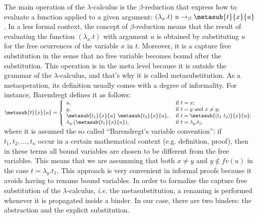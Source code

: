  The main operation of the $\lambda$-calculus is the $\beta$-reduction that express how to evaluate a function applied to a given argument: $(\lambda_x.t)\ u \to_{\beta} \metasub{t}{x}{u}$. In a less formal context, the concept of $\beta$-reduction means that the result of evaluating the function $(\lambda_x.t)$ with argument $u$ is obtained by substituting $u$ for the free ocurrences of the variable $x$ in $t$. Moreover, it is a capture free substitution in the sense that no free variable becomes bound after the substitution. This operation is in the meta level because it is outside the grammar of the $\lambda$-calculus, and that's why it is called metasubstitution. As a metaoperation, its definition usually comes with a degree of informality. For instance, Barendregt\cite{barendregtLambdaCalculusIts1984} defines it as follows: \vspace{.5cm}
$\metasub{t}{x}{u} = \left\{
 \begin{array}{ll}
  u, & \mbox{ if } t = x; \\
  y, & \mbox{ if } t = y \mbox{ and } x \neq y; \\
  \metasub{t_1}{x}{u}\ \metasub{t_2}{x}{u}, & \mbox{ if } t = \metasub{(t_1\ t_2)}{x}{u}; \\
  \lambda_y.(\metasub{t_1}{x}{u}), & \mbox{ if } t = \lambda_y.t_1.
 \end{array}\right.$ \vspace{.5cm}
\noindent where it is assumed the so called ``Barendregt's variable convention'': if $t_1, t_2, \ldots, t_n$ occur in a certain mathematical context (e.g. definition, proof), then in these terms all bound variables are chosen to be different from the free variables. This means that we are assumming that both $x \neq y$ and $y\notin fv(u)$ in the case $t = \lambda_y.t_1$. This approach is very convenient in informal proofs because it avoids having to rename bound variables. In order to formalize the capture free substitution of the $\lambda$-calculus, {\it i.e.} the metasubstitution, a renaming is performed whenever it is propagated inside a binder. In our case, there are two binders: the abstraction and the explicit substitution. 


